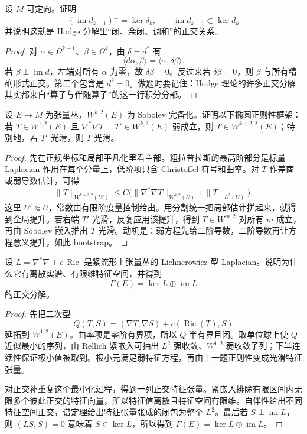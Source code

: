 \documentclass[11pt,a4paper,openany]{ctexbook}
\numberwithin{equation}{chapter}
\begin{document}
\begin{exercise}
设 \(M\) 可定向。证明
\[
(\operatorname{im}d_{k-1})^\perp=\ker\delta_k,\qquad
\operatorname{im}d_{k-1}\subset \ker d_k
\]
并说明这就是 Hodge 分解里“闭、余闭、调和”的正交关系。
\end{exercise}
\begin{proof}
对 \(\alpha\in\Omega^{k-1}\)、\(\beta\in\Omega^k\)，由 \(\delta=d^*\) 有
\[
\langle d\alpha,\beta\rangle=\langle \alpha,\delta\beta\rangle.
\]
若 \(\beta\perp\operatorname{im}d\)，左端对所有 \(\alpha\) 为零，故 \(\delta\beta=0\)。反过来若 \(\delta\beta=0\)，则 \(\beta\) 与所有精确形式正交。第二个包含是 \(d^2=0\)。做题时要记住：Hodge 理论的许多正交分解其实都来自“算子与伴随算子”的这一行积分分部。
\end{proof}

\begin{exercise}
设 \(E\to M\) 为张量丛，\(W^{k,2}(E)\) 为 Sobolev 完备化。证明以下椭圆正则性框架：若 \(T\in W^{1,2}(E)\) 且 \(\nabla^*\nabla T=T'\in W^{k,2}(E)\) 弱成立，则 \(T\in W^{k+2,2}(E)\)；特别地，若 \(T'\) 光滑，则 \(T\) 光滑。
\end{exercise}
\begin{proof}
先在正规坐标和局部平凡化里看主部。粗拉普拉斯的最高阶部分是标量 Laplacian 作用在每个分量上，低阶项只含 Christoffel 符号和曲率。对 \(T\) 作差商或弱导数估计，可得
\[
\|T\|_{W^{k+2,2}(U')}\le C\bigl(\|\nabla^*\nabla T\|_{W^{k,2}(U)}+\|T\|_{L^2(U)}\bigr).
\]
这里 \(U'\Subset U\)，常数由有限阶度量控制给出。用分割统一把局部估计拼起来，就得到全局提升。若右端 \(T'\) 光滑，反复应用该提升，得到 \(T\in W^{m,2}\) 对所有 \(m\) 成立，再由 Sobolev 嵌入推出 \(T\) 光滑。动机是：弱方程先给二阶导数，二阶导数再让方程意义提升，如此 bootstrap。
\end{proof}

\begin{exercise}
设 \(L=\nabla^*\nabla+c\,\operatorname{Ric}\) 是紧流形上张量丛的 Lichnerowicz 型 Laplacian。说明为什么它有离散实谱、有限维特征空间，并得到
\[
\Gamma(E)=\ker L\oplus \operatorname{im}L
\]
的正交分解。
\end{exercise}
\begin{proof}
先把二次型
\[
Q(T,S)=(\nabla T,\nabla S)+c(\operatorname{Ric}(T),S)
\]
延拓到 \(W^{1,2}(E)\)。曲率项是零阶有界项，所以 \(Q\) 半有界且闭。取单位球上使 \(Q\) 近似最小的序列，由 Rellich 紧嵌入可抽出 \(L^2\) 强收敛、\(W^{1,2}\) 弱收敛子列；下半连续性保证极小值被取到。极小元满足弱特征方程，再由上一题正则性变成光滑特征张量。

对正交补重复这个最小化过程，得到一列正交特征张量。紧嵌入排除有限区间内无限多个彼此正交的特征向量，所以特征值离散且特征空间有限维。自伴性给出不同特征空间正交，谱定理给出特征张量张成的闭包为整个 \(L^2\)。最后若 \(S\perp\operatorname{im}L\)，则 \((LS,S)=0\) 意味着 \(S\in\ker L\)，所以得到 \(\Gamma(E)=\ker L\oplus\operatorname{im}L\)。
\end{proof}
\end{document}
